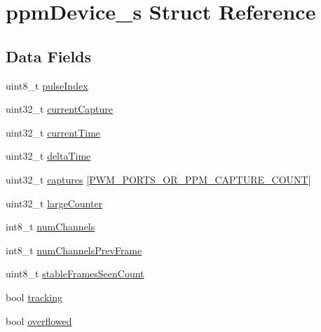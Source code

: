 \hypertarget{structppmDevice__s}{\section{ppm\+Device\+\_\+s Struct Reference}
\label{structppmDevice__s}
}
\subsection*{Data Fields}
\begin{DoxyCompactItemize}
\item 
uint8\+\_\+t \hyperlink{structppmDevice__s_a80d58307924700011d83b77c72e18d08}{pulse\+Index}
\item 
uint32\+\_\+t \hyperlink{structppmDevice__s_a5162a8e31e09554fc130ad99afd28a3e}{current\+Capture}
\item 
uint32\+\_\+t \hyperlink{structppmDevice__s_ac2682c776ebf6602c299a24c4a8b2dd4}{current\+Time}
\item 
uint32\+\_\+t \hyperlink{structppmDevice__s_ae268beff5080ded556ff76109a2cb4bb}{delta\+Time}
\item 
uint32\+\_\+t \hyperlink{structppmDevice__s_a0be72d915b8391f6e28d40e49c1fc376}{captures} \mbox{[}\hyperlink{pwm__rx_8c_a212eaddd701449ed3612bc114402a76e}{P\+W\+M\+\_\+\+P\+O\+R\+T\+S\+\_\+\+O\+R\+\_\+\+P\+P\+M\+\_\+\+C\+A\+P\+T\+U\+R\+E\+\_\+\+C\+O\+U\+N\+T}\mbox{]}
\item 
uint32\+\_\+t \hyperlink{structppmDevice__s_ae9d0b3ac12ab54935acb6b7fa5a952b2}{large\+Counter}
\item 
int8\+\_\+t \hyperlink{structppmDevice__s_a912713c6a467439748d7cd895cbcccf7}{num\+Channels}
\item 
int8\+\_\+t \hyperlink{structppmDevice__s_a9cfbbcd57b501453b4137c17da9a51f0}{num\+Channels\+Prev\+Frame}
\item 
uint8\+\_\+t \hyperlink{structppmDevice__s_ad5c61ff1690398bdd00a24003a7f15a3}{stable\+Frames\+Seen\+Count}
\item 
bool \hyperlink{structppmDevice__s_a49fb0737f180aab2feee8861a116293b}{tracking}
\item 
bool \hyperlink{structppmDevice__s_a4d138ae3eee59c95c22af0144bffd8c5}{overflowed}
\end{DoxyCompactItemize}



